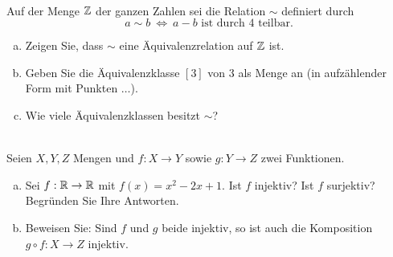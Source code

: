 \\
Auf der Menge $\mathbb{Z}$ der ganzen Zahlen sei die Relation $\sim$ definiert durch
\[a\sim b\ \Leftrightarrow\ a-b \text{ ist durch } 4 \text{ teilbar.}\]
\begin{enumerate}[(a)]
    \item Zeigen Sie, dass $\sim$ eine Äquivalenzrelation auf $\mathbb{Z}$ ist.
    \item Geben Sie die Äquivalenzklasse $[3]$ von $3$ als Menge an (in aufzählender Form mit Punkten $\ldots$).
    \item Wie viele Äquivalenzklassen besitzt $\sim$? 
\end{enumerate}

\\
Seien $X,Y,Z$ Mengen und $f:X\to Y$ sowie $g:Y\to Z$ zwei Funktionen.
\begin{enumerate}[(a)]
    \item Sei $f:\mathbb{R}\to\mathbb{R}$ mit $f(x)=x^2-2x+1$. Ist $f$ injektiv? Ist $f$ surjektiv? Begründen Sie Ihre Antworten.
    \item Beweisen Sie: Sind $f$ und $g$ beide injektiv, so ist auch die Komposition $g\circ f:X\to Z$ injektiv.
\end{enumerate}

